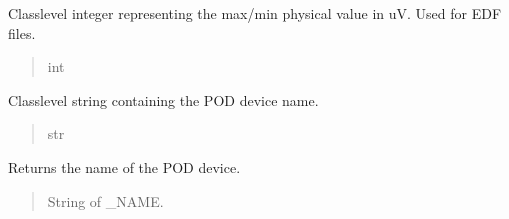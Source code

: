 \documentclass[letterpaper,10pt,english]{sphinxmanual}
\begin{document}
\begin{fulllineitems}

\begin{fulllineitems}
\label{\detokenize{Setup_8206HR:Setup_8206HR.Setup_8206HR._PHYSICAL_BOUND_uV}}
\pysigstartsignatures
{}
\pysigstopsignatures
\sphinxAtStartPar
Class\sphinxhyphen{}level integer representing the max/\sphinxhyphen{}min physical value in uV.             Used for EDF files.
\begin{quote}\begin{description}
\sphinxAtStartPar
int

\end{description}\end{quote}

\end{fulllineitems}


\begin{fulllineitems}
\label{\detokenize{Setup_8206HR:Setup_8206HR.Setup_8206HR._NAME}}
\pysigstartsignatures
{}
\pysigstopsignatures
\sphinxAtStartPar
Class\sphinxhyphen{}level string containing the POD device name.
\begin{quote}\begin{description}
\sphinxAtStartPar
str

\end{description}\end{quote}

\end{fulllineitems}


\begin{fulllineitems}
\label{\detokenize{Setup_8206HR:Setup_8206HR.Setup_8206HR.GetDeviceName}}
\pysigstartsignatures
{}
\pysigstopsignatures
\sphinxAtStartPar
Returns the name of the POD device.
\begin{quote}\begin{description}
\sphinxAtStartPar
String of \_NAME.


\end{description}
\end{quote}
\end{fulllineitems}
\end{fulllineitems}
\end{document}
